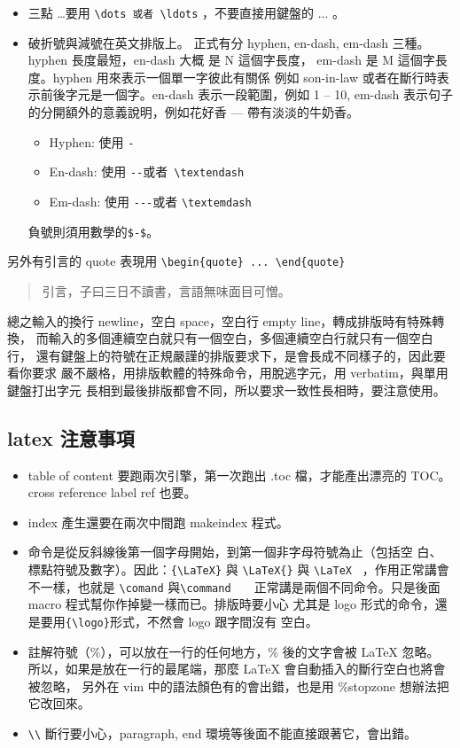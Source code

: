 \begin{itemize}
\item 三點 \dots 要用 \verb=\dots 或者 \ldots= ，不要直接用鍵盤的 ... 。
\item 破折號與減號在英文排版上。 正式有分 hyphen, en-dash, em-dash 三種。
hyphen 長度最短，en-dash 大概
是 N 這個字長度， em-dash 是 M 這個字長度。hyphen 用來表示一個單一字彼此有關係
例如 son-in-law 或者在斷行時表示前後字元是一個字。en-dash 表示一段範圍，例如
 1 -- 10, em-dash 表示句子的分開額外的意義說明，例如花好香 --- 帶有淡淡的牛奶香。
  \begin{itemize}
    \item Hyphen: 使用 \verb=-=
    \item En-dash: 使用 \verb=--=或者\verb= \textendash=
    \item Em-dash: 使用  \verb=---=或者 \verb=\textemdash=
  \end{itemize}
負號則須用數學的\verb=$-$=。
\end{itemize}
另外有引言的 quote 表現用 \verb=\begin{quote} ... \end{quote}=
\begin{quote}
引言，子曰三日不讀書，言語無味面目可憎。
\end{quote}
總之輸入的換行 newline，空白 space，空白行 empty line，轉成排版時有特殊轉換，
而輸入的多個連續空白就只有一個空白，多個連續空白行就只有一個空白行，
還有鍵盤上的符號在正規嚴謹的排版要求下，是會長成不同樣子的，因此要看你要求
嚴不嚴格，用排版軟體的特殊命令，用脫逃字元，用 verbatim，與單用鍵盤打出字元
長相到最後排版都會不同，所以要求一致性長相時，要注意使用。

\subsection{latex 注意事項}
\begin{itemize}
\item table of content 要跑兩次引擎，第一次跑出 .toc 檔，才能產出漂亮的 TOC。
      cross reference label ref 也要。
\item index 產生還要在兩次中間跑 makeindex 程式。
\item 命令是從反斜線後第一個字母開始，到第一個非字母符號為止（包括空
白、標點符號及數字）。因此：\verb={\LaTeX}= 與 \verb=\LaTeX{}= 與 
\verb=\LaTeX = ，作用正常講會不一樣，也就是 \verb=\comand= 與\verb=\command   =
正常講是兩個不同命令。只是後面 macro 程式幫你作掉變一樣而已。排版時要小心
尤其是 logo 形式的命令，還是要用\verb={\logo}=形式，不然會 logo 跟字間沒有
空白。
\item 註解符號（\%），可以放在一行的任何地方，\% 後的文字會被 {\LaTeX} 忽略。
所以，如果是放在一行的最尾端，那麼 {\LaTeX} 會自動插入的斷行空白也將會被忽略，
另外在 vim 中的語法顏色有的會出錯，也是用 \%stopzone 想辦法把它改回來。
\item \verb=\\= 斷行要小心，paragraph, end 環境等後面不能直接跟著它，會出錯。
\end{itemize}

